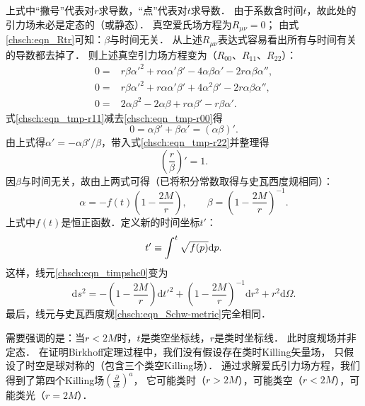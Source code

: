 上式中“撇号”代表对$r$求导数，“点”代表对$t$求导数．
由于系数含时间$t$，故此处的引力场未必是定态的（或静态）．
真空爱氏场方程为$R_{\mu\nu}=0$；
由式\eqref{chsch:eqn_Rtr}可知：$\beta$与时间无关．
从上述$R_{\mu\nu}$表达式容易看出所有与时间有关的导数都去掉了．
则上述真空引力场方程变为（$R_{00}$、$R_{11}$、$R_{22}$）：
\begin{align}
    0 =& r \beta  {\alpha'}^2  + r \alpha \alpha' \beta'
          -4 \alpha \beta  \alpha'-2 r\alpha \beta  \alpha'' ,\label{chsch:eqn_tmp-r00}\\
    0 =& r \beta \alpha'^2+r  \alpha \alpha' \beta'
    +   4 \alpha^2 \beta'   -2 r\alpha \beta \alpha'' ,\label{chsch:eqn_tmp-r11}\\
    0 =& 2 \alpha\beta ^2-2\alpha \beta +r\alpha \beta'-r \beta  \alpha' . \label{chsch:eqn_tmp-r22}
\end{align}
式\eqref{chsch:eqn_tmp-r11}减去\eqref{chsch:eqn_tmp-r00}得
\begin{equation}\label{chsch:eqn_abp0}
    0= \alpha \beta' + \beta  \alpha' = (\alpha \beta)' .
\end{equation}
由上式得$\alpha'=-\alpha \beta'/\beta$，带入式\eqref{chsch:eqn_tmp-r22}并整理得
\begin{equation}
    \left(\frac{r}{\beta}\right)'=1 .
\end{equation}
因$\beta$与时间无关，故由上两式可得（已将积分常数取得与史瓦西度规相同）：
\begin{equation}
    \alpha=- f(t) \left(1- \frac{2M}{r}\right),\qquad
    \beta= \left(1- \frac{2M}{r}\right)^{-1}.
\end{equation}
上式中$f(t)$是恒正函数．定义新的时间坐标$t'$：
\begin{equation}
    t'\equiv \int_{}^{t} \sqrt{f(p)} {\rm d}p .
\end{equation}
这样，线元\eqref{chsch:eqn_timpshc0}变为
\begin{equation}
    \mathrm{d} s^2=  - \left(1- \frac{2M}{r}\right)\mathrm{d} t'^2+
    \left(1- \frac{2M}{r}\right)^{-1}\mathrm{d} r^2 +r^2\mathrm{d} \Omega .
\end{equation}
最后，线元与史瓦西度规\eqref{chsch:eqn_Schw-metric}完全相同．

需要强调的是：当$r<2M$时，$t$是类空坐标线，$r$是类时坐标线．
此时度规场并非定态．
在证明Birkhoff定理过程中，我们没有假设存在类时Killing矢量场，
只假设了时空是球对称的（包含三个类空Killing场）．
通过求解爱氏引力场方程，我们得到了第四个Killing场$(\frac{\partial}{\partial t})^a$，
它可能类时（$r>2M$），可能类空（$r<2M$），可能类光（$r=2M$）．



